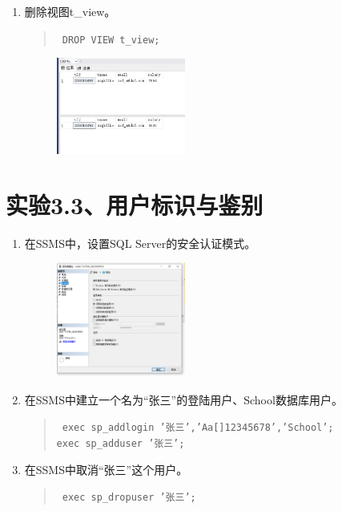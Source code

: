 \documentclass[a4paper,twoside]{article}
\begin{document}
\begin{spacing}{1.2}
\begin{enumerate}
\item	删除视图t\_view。
\begin{quote}
  \texttt{
    DROP VIEW t\_view;\\
  }
\end{quote}

\begin{figure}[htb]
  \centering
  \includegraphics[width=0.4\textwidth]{13.png}
\end{figure}
\end{enumerate}

\section{实验3.3、用户标识与鉴别}

\begin{enumerate}
  \item	在SSMS中，设置SQL Server的安全认证模式。
  \begin{figure}[htb]
    \centering
    \includegraphics[width=0.4\textwidth]{login.png}
  \end{figure}
  \item	在SSMS中建立一个名为“张三”的登陆用户、School数据库用户。
  \begin{quote}
    \texttt{
      exec sp\_addlogin '张三','Aa[]12345678','School';\\
exec sp\_adduser  '张三';
    }
  \end{quote}
  \item	在SSMS中取消“张三”这个用户。
  \begin{quote}
    \texttt{
exec sp\_dropuser  '张三';
    }
  \end{quote}
\end{enumerate}


\end{spacing}
\end{document}
